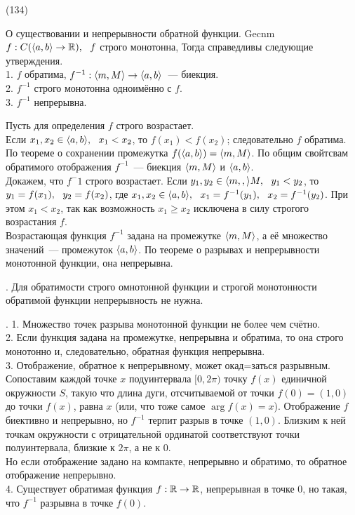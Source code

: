 (134)

\T \q О существовании и непрерывности обратной функции. Gecnm $f: C(\langle a, b \rangle \to \mathbb{R}),\ \  f$ строго монотонна,  Тогда справедливы следующие утверждения.\\
1. $f$ обратима, $f^{-1}: \langle m, M \rangle \to \langle a, b \rangle$~--- биекция.\\
2. $f^{-1}$ строго монотонна одноимённо с $f$.\\
3. $f^{-1}$ непрерывна.

\D Пусть для определения $f$ строго возрастает.\\
Если $x_1, x_2 \in \langle a, b \rangle,\ \  x_1 < x_2$, то $f(x_1) < f(x_2)$; следовательно $f$ обратима. По теореме о сохранении промежутка $f(\langle a, b \rangle) = \langle m, M \rangle$. По общим свойтсвам обратимого отображения $f^{-1}$~--- биекция $\langle m, M \rangle$ и $\langle a, b \rangle$.\\
Докажем, что $f^-1$ строго возрастает. Если $y_1, y_2 \in \langle m, , \rangle M,\ \  y_1 < y_2$, то $y_ 1 = f(x_1),\ \  y_2 = f(x_2)$, где $x_1, x_2 \in \langle a, b \rangle,\ \  x_1 = f^{-1}(y_1),\ \  x_2 = f^{-1}(y_2)$. При этом $x_1 < x_2$, так как возможность $x_1 \ge x_2$ исключена в силу строгого возрастания $f$.\\
Возрастающая функция $f^{-1}$ задана на промежутке $\langle m, M \rangle$, а её множество значений~--- промежуток $\langle a, b \rangle$. По теореме о разрывах и непрерывности монотонной функции, она непрерывна.

. Для обратимости строго омнотонной функции и строгой монотонности обратимой функции непрерывность не нужна.

. 1. Множество точек разрыва монотонной функции не более чем счётно.\\
2. Если функция задана на промежутке, непрерывна и обратима, то она строго монотонно и, следовательно, обратная функция непрерывна.\\
3. Отображение, обратное к непрерывному, может окад=заться разрывным. Сопоставим каждой точке $x$ подуинтервала $[0, 2\pi)$ точку $f(x)$ единичной окружности $S$, такую что длина дуги, отсчитываемой от точки $f(0) = (1, 0)$ до точки $f(x)$, равна $x$ (или, что тоже самое $\arg f(x) = x$). Отображение $f$ биективно и непрерывно, но $f^{-1}$ терпит разрыв в точке $(1, 0)$. Близким к ней точкам окружности с отрицательной ординатой соответствуют точки полуинтервала, близкие к $2\pi$, а не к 0.\\
Но если отображение задано на компакте, непрерывно и обратимо, то обратное отображение непрерывно.\\
4. Существует обратимая функция $f: \mathbb{R} \to \mathbb{R}$, непрерывная в точке 0, но такая, что $f^{-1}$ разрывна в точке $f(0)$.
